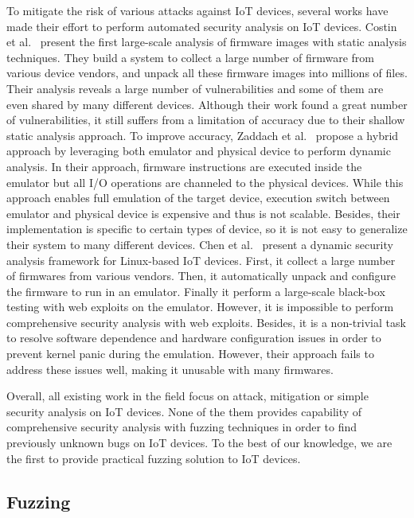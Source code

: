 To mitigate the risk of various attacks against IoT devices, several works have made their effort to perform automated security analysis on IoT devices. 
Costin et al.~\cite{costin2014large} present the first large-scale analysis of firmware images with static analysis techniques. They build a system to collect a large number of firmware from various device vendors, and unpack all these firmware images into millions of files. Their analysis reveals a large number of vulnerabilities and some of them are even shared by many different devices. Although their work found a great number of vulnerabilities, it still suffers from a limitation of accuracy due to their shallow static analysis approach. To improve accuracy, Zaddach et al.~\cite{zaddach2014avatar} propose a hybrid approach by leveraging both emulator and physical device to perform dynamic analysis. In their approach, firmware instructions are executed inside the emulator but all I/O operations are channeled to the physical devices. While this approach enables full emulation of the target device, execution switch between emulator and physical device is expensive and thus is not scalable. Besides, their implementation is specific to certain types of device, so it is not easy to generalize their system to many different devices. Chen et al.~\cite{chen2016towards} present a dynamic security analysis framework for Linux-based IoT devices. First, it collect a large number of firmwares from various vendors. Then, it automatically unpack and configure the firmware to run in an emulator. Finally it perform a large-scale black-box testing with web exploits on the emulator. However, it is impossible to perform comprehensive security analysis with web exploits. Besides, it is a non-trivial task to resolve software dependence and hardware configuration issues in order to prevent kernel panic during the emulation. However, their approach fails to address these issues well, making it unusable with many firmwares.  

Overall, all existing work in the field focus on attack, mitigation or simple security analysis on IoT devices. None of the them  provides capability of comprehensive security analysis with fuzzing techniques in order to find previously unknown bugs on IoT devices. To the best of our knowledge, we are the first to provide practical fuzzing solution to IoT devices. 


\subsection{Fuzzing}

